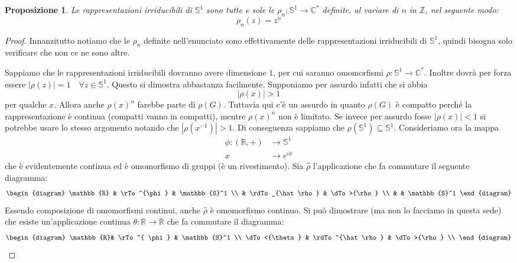 \documentclass[11pt]{article}
\theoremstyle{plain}
\newtheorem{prop}[thm]{Proposizione}
\theoremstyle{definition}
\theoremstyle{remark}
\newcommand{\C}{\mathbb{C}}
\newcommand{\R}{\mathbb{R}}
\newcommand{\Z}{\mathbb{Z}}
\newcommand{\tridiag}[6]{
	  \begin{diagram}
	  #1 & \rTo^{#2}  & #3        \\
	     & \rdTo_{#6} & \dTo>{#4}   \\
	     &          & #5
	  \end{diagram}
}
\begin{document}
\begin{prop}
  Le rappresentazioni irriducibili di $\mathbb{S}^1$ sono tutte e sole le $\rho_n:\mathbb{S}^1\to\C^*$ definite, al variare di $n$ in $\Z$, nel seguente modo:
  \[ \rho_n(z) = z^n \]
\end{prop}


\begin{proof}
  Innanzitutto notiamo che le $\rho_n$ definite nell'enunciato sono effettivamente delle rappresentazioni irriducibili di $\mathbb{S}^1$, quindi bisogna solo verificare che non ce ne sono altre.

  Sappiamo che le rappresentazioni irriducibili dovranno avere dimensione $1$, per cui saranno omomorfismi $\rho:\mathbb{S}^1\to\C^*$. Inoltre dovrà per forza essere $|\rho(z)| = 1 \quad \forall z \in \mathbb{S}^1$. Questo si dimostra abbastanza facilmente. Supponiamo per assurdo infatti che si abbia
  \[ |\rho(x)| > 1\]
  per qualche $x$. Allora anche $\rho(x)^n$ farebbe parte di $\rho(G)$. Tuttavia qui c'è un assurdo in quanto $\rho(G)$ è compatto perché la rappresentazione è continua (compatti vanno in compatti), mentre $\rho(x)^n$ non è limitato. Se invece per assurdo fosse $|\rho(x)| < 1$ si potrebbe usare lo stesso argomento notando che $|\rho(x^{-1})| > 1$.
  Di conseguenza sappiamo che $\rho(\mathbb{S}^1) \subseteq \mathbb{S}^1$.
  Consideriamo ora la mappa
  \begin{align*}
    \phi : (\R, +) &\to \mathbb{S}^1 \\
    x &\to  e^{ix}
  \end{align*}
  che è evidentemente continua ed è omomorfismo di gruppi (è un rivestimento).
  Sia $\hat\rho$ l'applicazione che fa commutare il seguente diagramma:
  \[\tridiag \R \phi {\mathbb{S}^1} \rho {\mathbb{S}^1} {\hat\rho}\]
  Essendo composizione di omomorfismi continui, anche $\hat\rho$ è omomorfismo continuo. Si può dimostrare (ma non lo facciamo in questa sede) che esiste un'applicazione continua $\theta:\R\to\R$ che fa commutare il diagramma:
  \[
  \begin{diagram}
    \R          & \rTo^{ \phi }         & \mathbb{S}^1           \\
    \dTo<{\theta}   & \rdTo^{\hat \rho}     & \dTo>{\rho}            \\

\end{diagram}\]
\end{proof}
\end{document}

